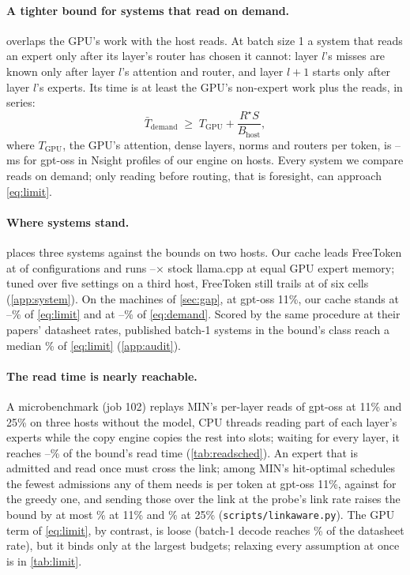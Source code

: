 \paragraph{A tighter bound for systems that read on demand.}  overlaps the GPU's work with the host
reads. At batch size 1 a system that reads an expert only after its layer's router has chosen it cannot: layer $l$'s
misses are known only after layer $l$'s attention and router, and layer $l{+}1$ starts only after layer $l$'s experts.
Its time is at least the GPU's non-expert work plus the reads, in series:
\begin{equation}
\bar T_{\text{demand}} \;\ge\; T_{\text{GPU}} + \frac{R^\star S}{B_{\mathrm{host}}},
\label{eq:demand}
\end{equation}
where $T_{\text{GPU}}$, the GPU's attention, dense layers, norms and routers per token, is \slGneMin--\slGneMax\,ms for
gpt-oss in Nsight profiles of our engine on \slProfHosts{} hosts. Every system we compare reads on demand; only reading
before routing, that is foresight, can approach \cref{eq:limit}.

\paragraph{Where systems stand.}  places three systems against the bounds on two hosts. Our cache
leads FreeToken \citep{freetoken} at \bothLeadCells{} of \bothCells{} configurations and runs
\bothLlamaXMin--\bothLlamaXMax$\times$ stock llama.cpp at equal GPU expert memory; tuned over five settings on a third
host, FreeToken still trails at \fttLeadCells{} of six cells (\cref{app:system}). On the \slMachines{} machines of
\cref{sec:gap}, at gpt-oss 11\%, our cache stands at \slMaxEffLowMin--\slMaxEffLowMax\% of \cref{eq:limit} and at
\slDemEffLowMin--\slDemEffLowMax\% of \cref{eq:demand}. Scored by the same procedure at their papers' datasheet rates,
published batch-1 systems in the bound's class reach a median \audInclassMed\% of \cref{eq:limit} (\cref{app:audit}).



\paragraph{The read time is nearly reachable.} A microbenchmark (job 102) replays MIN's per-layer reads of gpt-oss at
11\% and 25\% on three hosts without the model, CPU threads reading part of each layer's experts while the copy engine
copies the rest into slots; waiting for every layer, it reaches \jdLayerMin--\jdLayerMax\% of the bound's read time
(\cref{tab:readsched}). An expert that is admitted and read once must cross the link; among MIN's hit-optimal schedules
the fewest admissions any of them needs is \laAdmMinLow{} per token at gpt-oss 11\%, against \laAdmGreedyLow{} for the
greedy one, and sending those over the link at the probe's link rate raises the bound by at most \laOverLowMax\% at 11\%
and \laOverMidMax\% at 25\% (\texttt{scripts/linkaware.py}). The GPU term of \cref{eq:limit}, by contrast, is loose
(batch-1 decode reaches \gpuEffPctGpt\% of the datasheet rate), but it binds only at the largest budgets; relaxing every
assumption at once is in \cref{tab:limit}.

